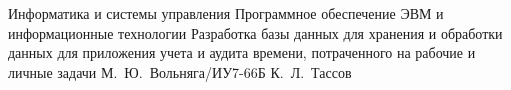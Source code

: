 \documentclass{bmstu}
\begin{document}
	\makecourseworktitle
	{Информатика и системы управления} %
	{Программное обеспечение ЭВМ и информационные технологии} %
	{Разработка базы данных для хранения и обработки данных для приложения учета и аудита времени, потраченного на рабочие и личные задачи} %
	{М.~Ю.~Вольняга/ИУ7-66Б} %
	{К.~Л.~Тассов} %
	{} %
		
	\maketableofcontents
	
	
	
	
	
	
	
	
	
	\makebibliography
\end{document}
